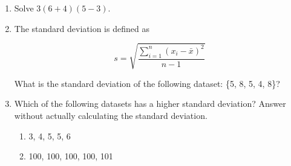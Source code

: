 \documentclass[12pt]{article}
\begin{document}
\begin{enumerate}
\item Solve $3 (6 + 4) (5 - 3)$. \\

\item The standard deviation is defined as

\[ s = \sqrt{ \frac{\sum_{i = 1}^n (x_i - \bar{x})^2}{n - 1} } \]

What is the standard deviation of the following dataset: \{5, 8, 5, 4, 8\}? \\

\item Which of the following datasets has a higher standard deviation? Answer without actually calculating the standard deviation.

\begin{enumerate}
\item 3, 4, 5, 5, 6
\item 100, 100, 100, 100, 101
\end{enumerate}

\end{enumerate}
\end{document}

